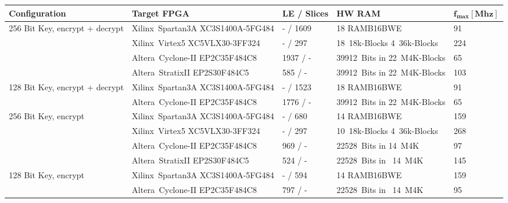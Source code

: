 \documentclass{ruschidoc}
\begin{document}
\begin{tabularx}{\textwidth}{|p{30mm}|X|p{20mm}|p{30mm}|p{18mm}|}
  \hline
  \bf{Configuration} & \bf{Target FPGA}\footnotemark[1] & \bf{LE / Slices} & \bf{HW RAM} & $\mathbf{f_{max}[Mhz]}$  \\ \hline
	\multirow{4}{30mm}{256 Bit Key, encrypt + decrypt} & \mbox{Xilinx\rtm\ Spartan3A} XC3S1400A-5FG484 &  - / 1609 & 18 RAMB16BWE & 91 \\ \cline{2-5}
	& \mbox{Xilinx\rtm\ Virtex5}   XC5VLX30-3FF324 &  - / 297 & \mbox{18 18k-Blocks}  \mbox{4 36k-Blocks} & 224 \\ \cline{2-5}
	& \mbox{Altera\rtm\ Cyclone-II} EP2C35F484C8 & 1937 / - &  \mbox{39912 Bits} in  \mbox{22 M4K-Blocks} & 65 \\ \cline{2-5}
	& \mbox{Altera\rtm\ StratixII} EP2S30F484C5 & 585 / - &  \mbox{39912 Bits} in  \mbox{22 M4K-Blocks} & 103  \\  
	\hline
	\multirow{2}{30mm}{128 Bit Key, encrypt + decrypt} & \mbox{Xilinx\rtm\ Spartan3A} XC3S1400A-5FG484 &  - / 1523 & 18 RAMB16BWE & 91 \\ \cline{2-5}
		& \mbox{Altera\rtm\ Cyclone-II} EP2C35F484C8 & 1776 / - &  \mbox{39912 Bits} in  \mbox{22 M4K-Blocks} & 65 \\ 
	\hline
	\multirow{4}{30mm}{256 Bit Key, encrypt} & \mbox{Xilinx\rtm\ Spartan3A}  XC3S1400A-5FG484 &  - / 680 & 14 RAMB16BWE & 159 \\ \cline{2-5}
	& \mbox{Xilinx\rtm\ Virtex5}   XC5VLX30-3FF324 &  - / 297 & \mbox{10 18k-Blocks}  \mbox{4 36k-Blocks} & 268 \\ \cline{2-5}
	& \mbox{Altera\rtm\ Cyclone-II} EP2C35F484C8 & 969 / - &  \mbox{22528 Bits} in  \mbox{14 M4K} & 97 \\ \cline{2-5}
	& \mbox{Altera\rtm\ StratixII} EP2S30F484C5 & 524 / - &  \mbox{22528 Bits} in \mbox{ 14 M4K} & 145  \\ 
	\hline
	\multirow{2}{30mm}{128 Bit Key, encrypt} & \mbox{Xilinx\rtm\ Spartan3A}  XC3S1400A-5FG484 &  - / 594 & 14 RAMB16BWE & 159 \\ \cline{2-5}
	& \mbox{Altera\rtm\ Cyclone-II} EP2C35F484C8 & 797 / - & \mbox{22528 Bits} in  \mbox{ 14 M4K} & 95  \\ \cline{2-5} 
	\hline
\end{tabularx}
\label{tab:ressources}
\end{document}
